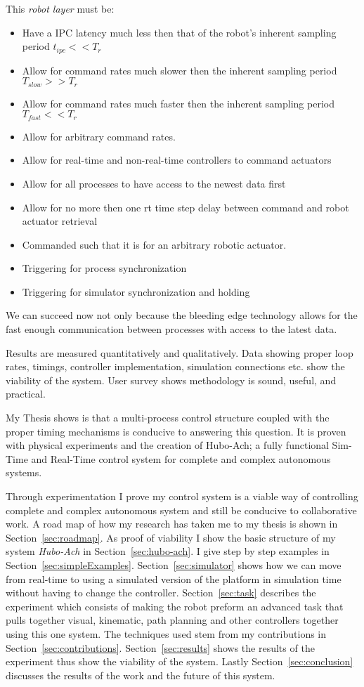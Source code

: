 This \textit{robot layer} must be:
\begin{itemize}
\item Have a IPC latency much less then that of the robot's inherent sampling period $t_{ipc}<<T_{r}$
\item Allow for command rates much slower then the inherent sampling period $T_{slow}>>T_{r}$
\item Allow for command rates much faster then the inherent sampling period $T_{fast}<<T_{r}$
\item Allow for arbitrary command rates.
\item Allow for real-time and non-real-time controllers to command actuators
\item Allow for all processes to have access to the newest data first
\item Allow for no more then one rt time step delay between command and robot actuator retrieval
\item Commanded such that it is for an arbitrary robotic actuator.
\item Triggering for process synchronization
\item Triggering for simulator synchronization and holding
\end{itemize}
We can succeed now not only because the bleeding edge technology allows for the fast enough communication between processes with access to the latest data.

Results are measured quantitatively and qualitatively.
Data showing proper loop rates, timings, controller implementation, simulation connections etc. show the viability of the system.
User survey shows methodology is sound, useful, and practical.





My Thesis shows is that a multi-process control structure coupled with the proper timing mechanisms is conducive to answering this question.
It is proven with physical experiments and the creation of Hubo-Ach\cite{lofaroRAM2013}; a fully functional Sim-Time and Real-Time control system for complete and complex autonomous systems.

Through experimentation I prove my control system is a viable way of controlling complete and complex autonomous system and still be conducive to collaborative work.  
A road map of how my research has taken me to my thesis is shown in Section~\ref{sec:roadmap}.
As proof of viability I show the basic structure of my system \textit{Hubo-Ach} in Section~\ref{sec:hubo-ach}.  
I give step by step examples in Section~\ref{sec:simpleExamples}.
Section~\ref{sec:simulator} shows how we can move from real-time to using a simulated version of the platform in simulation time without having to change the controller.
Section~\ref{sec:task} describes the experiment which consists of making the robot preform an advanced task that pulls together visual, kinematic, path planning and other controllers together using this one system.
The techniques used stem from my contributions in Section~\ref{sec:contributions}.
Section~\ref{sec:results} shows the results of the experiment thus show the viability of the system.
Lastly Section~\ref{sec:conclusion} discusses the results of the work and the future of this system.

